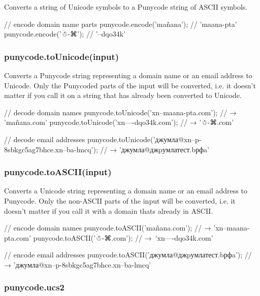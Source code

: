 Converts a string of Unicode symbols to a Punycode string of A\+S\+C\+II symbols.


\begin{DoxyCode}
// encode domain name parts
punycode.encode('mañana'); // 'maana-pta'
punycode.encode('☃-⌘'); // '--dqo34k'
\end{DoxyCode}


\subsubsection*{{\ttfamily punycode.\+to\+Unicode(input)}}

Converts a Punycode string representing a domain name or an email address to Unicode. Only the Punycoded parts of the input will be converted, i.\+e. it doesn’t matter if you call it on a string that has already been converted to Unicode.


\begin{DoxyCode}
// decode domain names
punycode.toUnicode('xn--maana-pta.com');
// → 'mañana.com'
punycode.toUnicode('xn----dqo34k.com');
// → '☃-⌘.com'

// decode email addresses
punycode.toUnicode('джумла@xn--p-8sbkgc5ag7bhce.xn--ba-lmcq');
// → 'джумла@джpумлатест.bрфa'
\end{DoxyCode}


\subsubsection*{{\ttfamily punycode.\+to\+A\+S\+C\+I\+I(input)}}

Converts a Unicode string representing a domain name or an email address to Punycode. Only the non-\/\+A\+S\+C\+II parts of the input will be converted, i.\+e. it doesn’t matter if you call it with a domain that\textquotesingle{}s already in A\+S\+C\+II.


\begin{DoxyCode}
// encode domain names
punycode.toASCII('mañana.com');
// → 'xn--maana-pta.com'
punycode.toASCII('☃-⌘.com');
// → 'xn----dqo34k.com'

// encode email addresses
punycode.toASCII('джумла@джpумлатест.bрфa');
// → 'джумла@xn--p-8sbkgc5ag7bhce.xn--ba-lmcq'
\end{DoxyCode}


\subsubsection*{{\ttfamily punycode.\+ucs2}}

